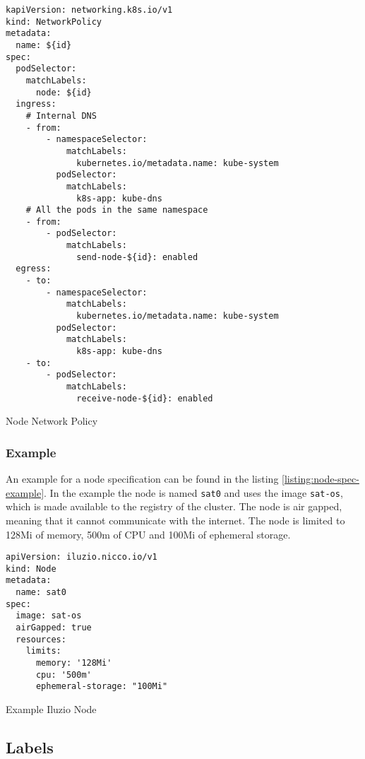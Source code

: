 \begin{listing}[H]
  \begin{verbatim}
kapiVersion: networking.k8s.io/v1
kind: NetworkPolicy
metadata:
  name: ${id}
spec:
  podSelector:
    matchLabels:
      node: ${id}
  ingress:
    # Internal DNS
    - from:
        - namespaceSelector:
            matchLabels:
              kubernetes.io/metadata.name: kube-system
          podSelector:
            matchLabels:
              k8s-app: kube-dns
    # All the pods in the same namespace
    - from:
        - podSelector:
            matchLabels:
              send-node-${id}: enabled
  egress:
    - to:
        - namespaceSelector:
            matchLabels:
              kubernetes.io/metadata.name: kube-system
          podSelector:
            matchLabels:
              k8s-app: kube-dns
    - to:
        - podSelector:
            matchLabels:
              receive-node-${id}: enabled
  \end{verbatim}
  \caption{Node Network Policy}
  \label{listing:node-network-policy-spec}
\end{listing}

\subsubsection{Example}

An example for a node specification can be found in the listing \ref{listing:node-spec-example}. In the example the node is named \verb|sat0| and uses the image \verb|sat-os|, which is made available to the registry of the cluster. The node is air gapped, meaning that it cannot communicate with the internet. The node is limited to 128Mi of memory, 500m of CPU and 100Mi of ephemeral storage.

\begin{listing}[H]
  \begin{verbatim}
apiVersion: iluzio.nicco.io/v1
kind: Node
metadata:
  name: sat0
spec:
  image: sat-os
  airGapped: true
  resources:
    limits:
      memory: '128Mi'
      cpu: '500m'
      ephemeral-storage: "100Mi"
  \end{verbatim}
  \caption{Example Iluzio Node}
  \label{listing:node-spec-example}
\end{listing}

\subsection{Labels}

